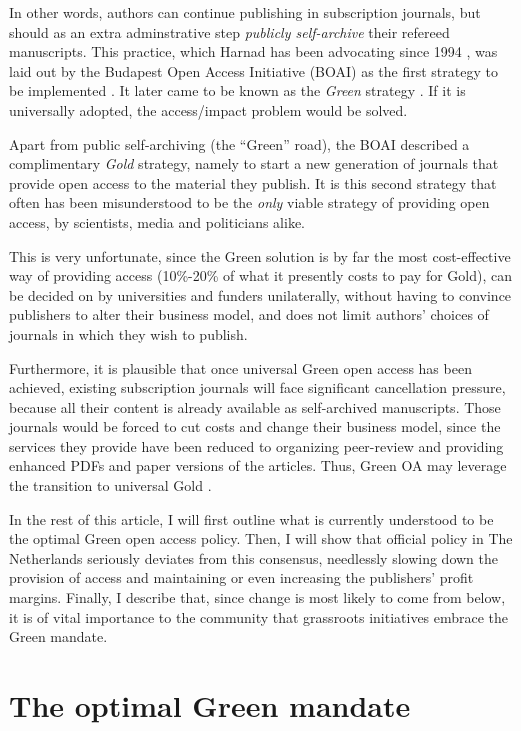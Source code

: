 \documentclass[11pt, openany, oneside, article, a4paper, twocolumn]{memoir}
\begin{document}
In other words, authors can continue publishing in subscription journals,
but should as an extra adminstrative step \emph{publicly self-archive}
their refereed manuscripts. This practice, which Harnad has been
advocating since 1994 \cite{harnad1995subversive}, was laid out by the
Budapest Open Access Initiative (BOAI) as the first strategy to be
implemented \cite{boai}. It later came to be known as the \emph{Green}
strategy \cite{harnad2004access}. If it is universally adopted, the
access/impact problem would be solved.

Apart from public self-archiving (the \enquote{Green} road), the BOAI
described a complimentary \emph{Gold} strategy, namely to start a new
generation of journals that provide open access to the material they
publish. It is this second strategy that often has been misunderstood to
be the \emph{only} viable strategy of providing open access, by
scientists, media and politicians alike.

This is very unfortunate, since the Green solution is by far the most
cost-effective way of providing access \cite{houghton2013planting}
(10\%-20\% of what it presently costs to pay for Gold), can be decided on
by universities and funders unilaterally, without having to convince
publishers to alter their business model, and does not limit authors'
choices of journals in which they wish to publish.

Furthermore, it is plausible that once universal Green open access has been
achieved, existing subscription journals will face significant cancellation
pressure, because all their content is already available as self-archived
manuscripts. Those journals would be forced to cut costs and change their
business model, since the services they provide have been reduced to organizing
peer-review and providing enhanced PDFs and paper versions of the articles.
Thus, Green OA may leverage the transition to universal Gold
\cite{harnad2007green_road}.

In the rest of this article, I will first outline what is currently
understood to be the optimal Green open access policy. Then, I will show
that official policy in The Netherlands seriously deviates from this
consensus, needlessly slowing down the provision of access and maintaining
or even increasing the publishers' profit margins. Finally, I describe
that, since change is most likely to come from below, it is of vital
importance to the community that grassroots initiatives embrace the Green
mandate.

\section{The optimal Green mandate}
\end{document}
